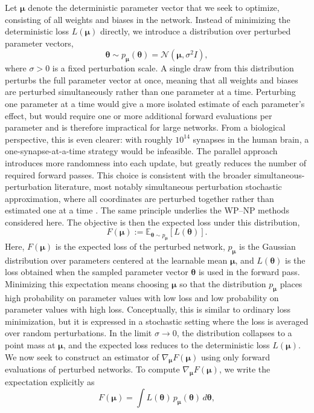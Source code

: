 Let \(\boldsymbol{\mu}\) denote the deterministic parameter vector that we seek to optimize, consisting of all weights and biases in the network. Instead of minimizing the deterministic loss \(L(\boldsymbol{\mu})\) directly, we introduce a distribution over perturbed parameter vectors,
\[
\boldsymbol{\theta} \sim p_{\boldsymbol{\mu}}(\boldsymbol{\theta})
=
\mathcal{N}(\boldsymbol{\mu},\sigma^2 I),
\]
where \(\sigma>0\) is a fixed perturbation scale. A single draw from this distribution perturbs the full parameter vector at once, meaning that all weights and biases are perturbed simultaneously rather than one parameter at a time. Perturbing one parameter at a time would give a more isolated estimate of each parameter's effect, but would require one or more additional forward evaluations per parameter and is therefore impractical for large networks. From a biological perspective, this is even clearer: with roughly \(10^{14}\) synapses in the human brain, a one-synapse-at-a-time strategy would be infeasible. The parallel approach introduces more randomness into each update, but greatly reduces the number of required forward passes. This choice is consistent with the broader simultaneous-perturbation literature, most notably simultaneous perturbation stochastic approximation, where all coordinates are perturbed together rather than estimated one at a time \parencite{spall_multivariate_1992}. The same principle underlies the WP--NP methods considered here. The objective is then the expected loss under this distribution,
\[
F(\boldsymbol{\mu})
:=
\mathbb{E}_{\boldsymbol{\theta}\sim p_{\boldsymbol{\mu}}}
\left[
L(\boldsymbol{\theta})
\right].
\]
Here, \(F(\boldsymbol{\mu})\) is the expected loss of the perturbed network, \(p_{\boldsymbol{\mu}}\) is the Gaussian distribution over parameters centered at the learnable mean \(\boldsymbol{\mu}\), and \(L(\boldsymbol{\theta})\) is the loss obtained when the sampled parameter vector \(\boldsymbol{\theta}\) is used in the forward pass. Minimizing this expectation means choosing \(\boldsymbol{\mu}\) so that the distribution \(p_{\boldsymbol{\mu}}\) places high probability on parameter values with low loss and low probability on parameter values with high loss. Conceptually, this is similar to ordinary loss minimization, but it is expressed in a stochastic setting where the loss is averaged over random perturbations. In the limit \(\sigma\to 0\), the distribution collapses to a point mass at \(\boldsymbol{\mu}\), and the expected loss reduces to the deterministic loss \(L(\boldsymbol{\mu})\). We now seek to construct an estimator of \(\nabla_{\boldsymbol{\mu}}F(\boldsymbol{\mu})\) using only forward evaluations of perturbed networks.
To compute $\nabla_{\boldsymbol{\mu}} F(\boldsymbol{\mu})$, we write the expectation explicitly as
\[
F(\boldsymbol{\mu})
=
\int L(\boldsymbol{\theta})\, p_{\boldsymbol{\mu}}(\boldsymbol{\theta})\, d\boldsymbol{\theta},
\]

